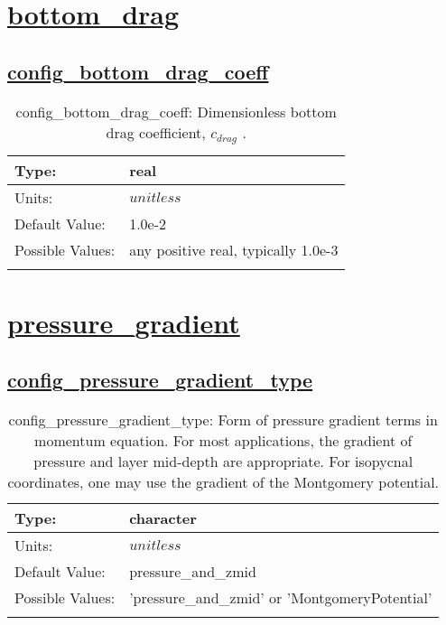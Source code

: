 \section[bottom\_drag]{\hyperref[sec:nm_tab_bottom_drag]{bottom\_drag}}
\label{sec:nm_sec_bottom_drag}
\subsection[config\_bottom\_drag\_coeff]{\hyperref[sec:nm_tab_bottom_drag]{config\_bottom\_drag\_coeff}}
\label{subsec:nm_sec_config_bottom_drag_coeff}
\begin{center}
\begin{longtable}{| p{2.0in} | p{4.0in} |}
    \hline
    Type: & real \\
    \hline
    Units: & $unitless$ \\
    \hline
    Default Value: & 1.0e-2 \\
    \hline
    Possible Values: & any positive real, typically 1.0e-3 \\
    \hline
    \caption{config\_bottom\_drag\_coeff:  Dimensionless bottom drag coefficient,  $c_{drag}$ .}
\end{longtable}
\end{center}
\section[pressure\_gradient]{\hyperref[sec:nm_tab_pressure_gradient]{pressure\_gradient}}
\label{sec:nm_sec_pressure_gradient}
\subsection[config\_pressure\_gradient\_type]{\hyperref[sec:nm_tab_pressure_gradient]{config\_pressure\_gradient\_type}}
\label{subsec:nm_sec_config_pressure_gradient_type}
\begin{center}
\begin{longtable}{| p{2.0in} | p{4.0in} |}
    \hline
    Type: & character \\
    \hline
    Units: & $unitless$ \\
    \hline
    Default Value: & pressure\_and\_zmid \\
    \hline
    Possible Values: & 'pressure\_and\_zmid' or 'MontgomeryPotential' \\
    \hline
    \caption{config\_pressure\_gradient\_type: Form of pressure gradient terms in momentum equation. For most applications, the gradient of pressure and layer mid-depth are appropriate.  For isopycnal coordinates, one may use the gradient of the Montgomery potential.}
\end{longtable}
\end{center}
